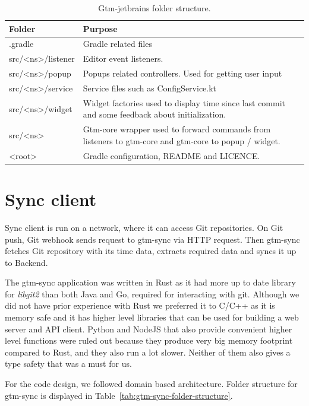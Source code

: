 \begin{table}[h]
    \centering
    \begin{tabular}{ | p{3cm} | p{10cm} |}
        \hline
        \textbf{Folder} & \textbf{Purpose}\\
        \hline
        .gradle & Gradle related files\\
        \hline
        src/<ns>/listener & Editor event listeners.\\
        \hline
        src/<ns>/popup & Popups related controllers.
        Used for getting user input\\
        \hline
        src/<ns>/service & Service files such as ConfigService.kt\\
        \hline
        src/<ns>/widget & Widget factories used to display time since last commit and some feedback about initialization.\\
        \hline
        src/<ns> & Gtm-core wrapper used to forward commands from listeners to gtm-core and gtm-core to popup / widget.\\
        \hline
        <root> & Gradle configuration, README and LICENCE.\\
        \hline
    \end{tabular}
    \caption{Gtm-jetbrains folder structure.}
    \label{tab:gtm-jetbrains-folder-structure}
\end{table}

\section{Sync client}\label{sec:sync-client}
Sync client is run on a network, where it can access Git repositories.
On Git push, Git webhook sends request to gtm-sync via HTTP request.
Then gtm-sync fetches Git repository with its time data, extracts required data and syncs it up to Backend.

The gtm-sync application was written in Rust as it had more up to date library for \textit{libgit2} than both Java and Go, required for interacting with git.
Although we did not have prior experience with Rust we preferred it to C/C++ as it is memory safe and it has higher level libraries that can be
used for building a web server and API client.
Python and NodeJS that also provide convenient higher level functions were ruled out because they produce very
big memory footprint compared to Rust, and they also run a lot slower.
Neither of them also gives a type safety that was a must for us.

For the code design, we followed domain based architecture.
Folder structure for gtm-sync is displayed in Table~\ref{tab:gtm-sync-folder-structure}.

